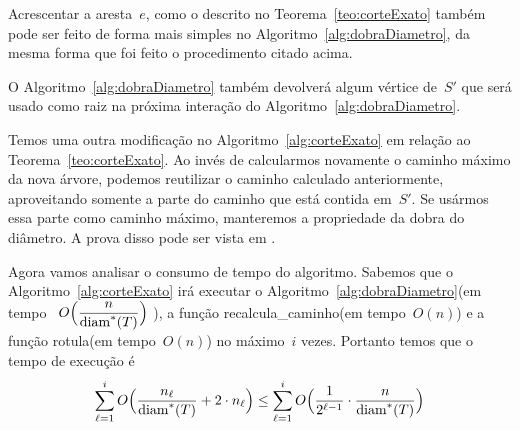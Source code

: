 		Acrescentar a aresta~$e$, como o descrito no
		Teorema~\ref{teo:corteExato} também pode ser feito de 
		forma mais simples no Algoritmo~\ref{alg:dobraDiametro},
		da mesma forma que foi feito o procedimento citado acima.

		O Algoritmo~\ref{alg:dobraDiametro} também devolverá 
		algum vértice de~$S'$ que será usado como raiz na 
		próxima interação do Algoritmo~\ref{alg:dobraDiametro}.

		Temos uma outra modificação no Algoritmo~\ref{alg:corteExato}   
		em relação ao Teorema~\ref{teo:corteExato}.
		Ao invés de calcularmos novamente o caminho máximo da nova
		árvore, podemos reutilizar o caminho calculado anteriormente,
		aproveitando somente a parte do caminho que está contida 
		em~$S'$. 
		Se usármos essa parte como caminho máximo,
		manteremos a propriedade da dobra do diâmetro.
		A prova disso pode ser vista em {\cite{Schmidt15}}.

		\bigskip

		Agora vamos analisar o consumo de tempo do algoritmo.
		Sabemos que o Algoritmo~\ref{alg:corteExato} irá executar
		o Algoritmo~\ref{alg:dobraDiametro}(em 
		tempo ~${O\Big(\dfrac{n}{\mathrm{diam}^*(T)}\Big)}$ ), a função
		{\sc recalcula\_caminho}(em tempo~$O(n)$) e a função
		{\sc rotula}(em tempo~$O(n)$) no máximo~$i$ vezes.
		Portanto temos que o tempo de execução é
		\begin{align}
			\displaystyle\sum_{\ell=1}^{i} O\Big(\dfrac{n_\ell}{\mathrm{diam}^*(T)} + 2\cdot n_\ell\Big)
			\le \displaystyle\sum_{\ell=1}^{i} O\Big(\dfrac{1}{2^{\ell-1}}\cdot\dfrac{n}{\mathrm{diam}^*(T)}\Big)
		\end{align}



		